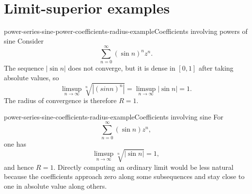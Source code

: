 \documentclass[preview]{standalone}
\begin{document}
\section{Limit-superior examples}

\begin{snippetexample}{power-series-sine-power-coefficients-radius-example}{Coefficients involving powers of sine}
    Consider
    \[
        \sum_{n=0}^{\infty}(\sin n)^nz^n.
    \]
    The sequence \(|\sin n|\) does not converge, but it is dense in
    \([0,1]\) after taking absolute values, so
    \[
        \limsup_{n\to\infty}\sqrt[n]{|(sin n)^n|}
        =\limsup_{n\to\infty}|\sin n|=1.
    \]
    The radius of convergence is therefore \(R=1\).
\end{snippetexample}

\begin{snippetexample}{power-series-sine-coefficients-radius-example}{Coefficients involving sine}
    For
    \[
        \sum_{n=0}^{\infty}(\sin n)z^n,
    \]
    one has
    \[
        \limsup_{n\to\infty}\sqrt[n]{|\sin n|}=1,
    \]
    and hence \(R=1\). Directly computing an ordinary limit would be less
    natural because the coefficients approach zero along some subsequences
    and stay close to one in absolute value along others.
\end{snippetexample}
\end{document}
